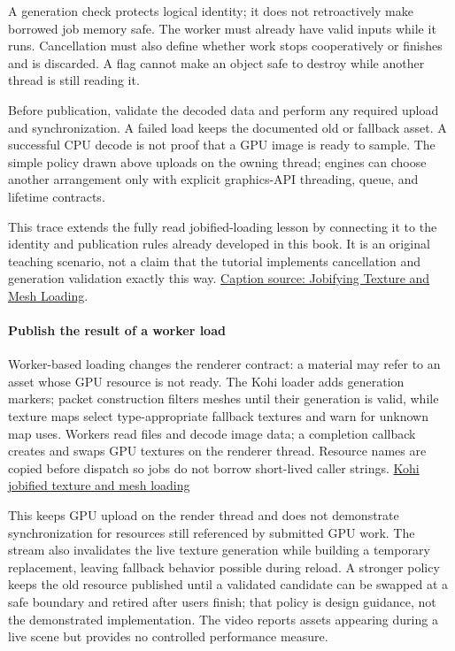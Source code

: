 A generation check protects logical identity; it does not retroactively make borrowed job memory safe. The worker must already have valid inputs while it runs. Cancellation must also define whether work stops cooperatively or finishes and is discarded. A flag cannot make an object safe to destroy while another thread is still reading it.

Before publication, validate the decoded data and perform any required upload and synchronization. A failed load keeps the documented old or fallback asset. A successful CPU decode is not proof that a GPU image is ready to sample. The simple policy drawn above uploads on the owning thread; engines can choose another arrangement only with explicit graphics-API threading, queue, and lifetime contracts.

This trace extends the fully read jobified-loading lesson by connecting it to the identity and publication rules already developed in this book. It is an original teaching scenario, not a claim that the tutorial implements cancellation and generation validation exactly this way. \href{https://www.youtube.com/watch?v=dRxw-C-eBGU}{Caption source: Jobifying Texture and Mesh Loading}.

\paragraph{Publish the result of a worker load}\label{06-engine-ii-ch027-publish-the-result-of-a-worker-load}

Worker-based loading changes the renderer contract: a material may refer to an asset whose GPU resource is not ready. The Kohi loader adds generation markers; packet construction filters meshes until their generation is valid, while texture maps select type-appropriate fallback textures and warn for unknown map uses. Workers read files and decode image data; a completion callback creates and swaps GPU textures on the renderer thread. Resource names are copied before dispatch so jobs do not borrow short-lived caller strings. \href{https://www.youtube.com/watch?v=dRxw-C-eBGU}{Kohi jobified texture and mesh loading}

This keeps GPU upload on the render thread and does not demonstrate synchronization for resources still referenced by submitted GPU work. The stream also invalidates the live texture generation while building a temporary replacement, leaving fallback behavior possible during reload. A stronger policy keeps the old resource published until a validated candidate can be swapped at a safe boundary and retired after users finish; that policy is design guidance, not the demonstrated implementation. The video reports assets appearing during a live scene but provides no controlled performance measure.

